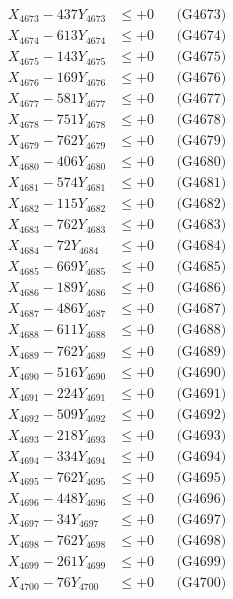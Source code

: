 \documentclass[a4paper,10pt]{article}
\begin{document}
{\begin{align}
X_{4673} - 437Y_{4673} &\leq +0 && \text{(G4673)} \\
X_{4674} - 613Y_{4674} &\leq +0 && \text{(G4674)} \\
X_{4675} - 143Y_{4675} &\leq +0 && \text{(G4675)} \\
X_{4676} - 169Y_{4676} &\leq +0 && \text{(G4676)} \\
X_{4677} - 581Y_{4677} &\leq +0 && \text{(G4677)} \\
X_{4678} - 751Y_{4678} &\leq +0 && \text{(G4678)} \\
X_{4679} - 762Y_{4679} &\leq +0 && \text{(G4679)} \\
X_{4680} - 406Y_{4680} &\leq +0 && \text{(G4680)} \\
\allowbreak
X_{4681} - 574Y_{4681} &\leq +0 && \text{(G4681)} \\
X_{4682} - 115Y_{4682} &\leq +0 && \text{(G4682)} \\
X_{4683} - 762Y_{4683} &\leq +0 && \text{(G4683)} \\
X_{4684} - 72Y_{4684} &\leq +0 && \text{(G4684)} \\
X_{4685} - 669Y_{4685} &\leq +0 && \text{(G4685)} \\
X_{4686} - 189Y_{4686} &\leq +0 && \text{(G4686)} \\
X_{4687} - 486Y_{4687} &\leq +0 && \text{(G4687)} \\
X_{4688} - 611Y_{4688} &\leq +0 && \text{(G4688)} \\
X_{4689} - 762Y_{4689} &\leq +0 && \text{(G4689)} \\
X_{4690} - 516Y_{4690} &\leq +0 && \text{(G4690)} \\
\allowbreak
X_{4691} - 224Y_{4691} &\leq +0 && \text{(G4691)} \\
X_{4692} - 509Y_{4692} &\leq +0 && \text{(G4692)} \\
X_{4693} - 218Y_{4693} &\leq +0 && \text{(G4693)} \\
X_{4694} - 334Y_{4694} &\leq +0 && \text{(G4694)} \\
X_{4695} - 762Y_{4695} &\leq +0 && \text{(G4695)} \\
X_{4696} - 448Y_{4696} &\leq +0 && \text{(G4696)} \\
X_{4697} - 34Y_{4697} &\leq +0 && \text{(G4697)} \\
X_{4698} - 762Y_{4698} &\leq +0 && \text{(G4698)} \\
X_{4699} - 261Y_{4699} &\leq +0 && \text{(G4699)} \\
X_{4700} - 76Y_{4700} &\leq +0 && \text{(G4700)} \\

\end{align}}
\end{document}
